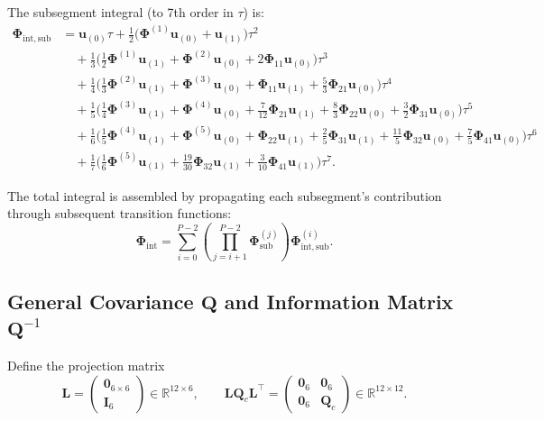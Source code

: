 \documentclass[11pt,a4paper]{article}
\newcommand{\R}{\mathbb{R}}
\newcommand{\inv}{^{-1}}
\newcommand{\bPhi}{\bm{\Phi}}
\newcommand{\bQ}{\mathbf{Q}}
\newcommand{\bL}{\mathbf{L}}
\newcommand{\bI}{\mathbf{I}}
\newcommand{\bzero}{\mathbf{0}}
\begin{document}
The subsegment integral (to 7th order in $\tau$) is:
\begin{align}
    \bPhi_{\mathrm{int,sub}} &= \mathbf{u}_{(0)}\tau + \tfrac{1}{2}\bigl(\bPhi^{(1)}\mathbf{u}_{(0)} + \mathbf{u}_{(1)}\bigr)\tau^2 \nonumber\\
    &\quad + \tfrac{1}{3}\bigl(\tfrac{1}{2}\bPhi^{(1)}\mathbf{u}_{(1)} + \bPhi^{(2)}\mathbf{u}_{(0)} + 2\bPhi_{11}\mathbf{u}_{(0)}\bigr)\tau^3 \nonumber\\
    &\quad + \tfrac{1}{4}\bigl(\tfrac{1}{3}\bPhi^{(2)}\mathbf{u}_{(1)} + \bPhi^{(3)}\mathbf{u}_{(0)} + \bPhi_{11}\mathbf{u}_{(1)} + \tfrac{5}{3}\bPhi_{21}\mathbf{u}_{(0)}\bigr)\tau^4 \nonumber\\
    &\quad + \tfrac{1}{5}\bigl(\tfrac{1}{4}\bPhi^{(3)}\mathbf{u}_{(1)} + \bPhi^{(4)}\mathbf{u}_{(0)} + \tfrac{7}{12}\bPhi_{21}\mathbf{u}_{(1)} + \tfrac{8}{3}\bPhi_{22}\mathbf{u}_{(0)} + \tfrac{3}{2}\bPhi_{31}\mathbf{u}_{(0)}\bigr)\tau^5 \nonumber\\
    &\quad + \tfrac{1}{6}\bigl(\tfrac{1}{5}\bPhi^{(4)}\mathbf{u}_{(1)} + \bPhi^{(5)}\mathbf{u}_{(0)} + \bPhi_{22}\mathbf{u}_{(1)} + \tfrac{2}{5}\bPhi_{31}\mathbf{u}_{(1)} + \tfrac{11}{5}\bPhi_{32}\mathbf{u}_{(0)} + \tfrac{7}{5}\bPhi_{41}\mathbf{u}_{(0)}\bigr)\tau^6 \nonumber\\
    &\quad + \tfrac{1}{7}\bigl(\tfrac{1}{6}\bPhi^{(5)}\mathbf{u}_{(1)} + \tfrac{19}{30}\bPhi_{32}\mathbf{u}_{(1)} + \tfrac{3}{10}\bPhi_{41}\mathbf{u}_{(1)}\bigr)\tau^7.
    \label{eq:phi-int-pwl}
\end{align}

The total integral is assembled by propagating each subsegment's contribution through subsequent transition functions:
\begin{equation}
    \bPhi_{\mathrm{int}} = \sum_{i=0}^{P-2} \left(\prod_{j=i+1}^{P-2} \bPhi_{\mathrm{sub}}^{(j)}\right) \bPhi_{\mathrm{int,sub}}^{(i)}.
\end{equation}

\subsection{General Covariance \texorpdfstring{$\bQ$}{Q} and Information Matrix \texorpdfstring{$\bQ\inv$}{Q inv}}
\label{sec:general-qinv}

Define the projection matrix
\begin{equation}
    \bL = \begin{pmatrix} \bzero_{6\times 6} \\ \bI_6 \end{pmatrix} \in \R^{12 \times 6}, \qquad
    \bL\bQ_c\bL^\top = \begin{pmatrix} \bzero_6 & \bzero_6 \\ \bzero_6 & \bQ_c \end{pmatrix} \in \R^{12 \times 12}.
    \label{eq:LQLT}
\end{equation}
\end{document}
